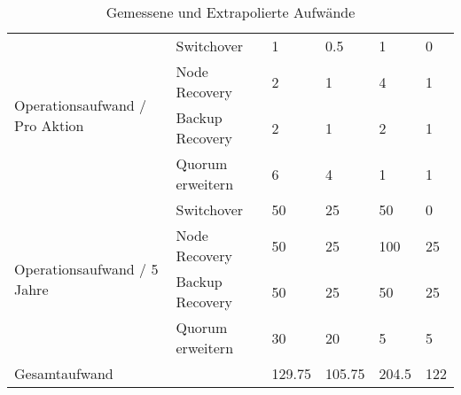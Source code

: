 \begin{table}[H]
{\begin{tabular}{@{}llllll@{}}
\multirow{4}{*}{Operationsaufwand / Pro Aktion} & Switchover                             & 1                 & 0.5                          & 1                 & 0          \\
                                                & Node Recovery                          & 2                 & 1                            & 4                 & 1          \\
                                                & Backup Recovery                        & 2                 & 1                            & 2                 & 1          \\
                                                & Quorum erweitern                       & 6                 & 4                            & 1                 & 1          \\
\multirow{4}{*}{Operationsaufwand / 5 Jahre}    & Switchover                             & 50                & 25                           & 50                & 0          \\
                                                & Node Recovery                          & 50                & 25                           & 100               & 25         \\
                                                & Backup Recovery                        & 50                & 25                           & 50                & 25         \\
                                                & Quorum erweitern                       & 30                & 20                           & 5                 & 5          \\ \midrule
\multicolumn{2}{l}{Gesamtaufwand}                                                        & 129.75            & 105.75                       & 204.5             & 122        \\ \bottomrule
\end{tabular}%
}
\caption{Gemessene und Extrapolierte Aufwände}
\label{tab:time_investment}
\end{table}